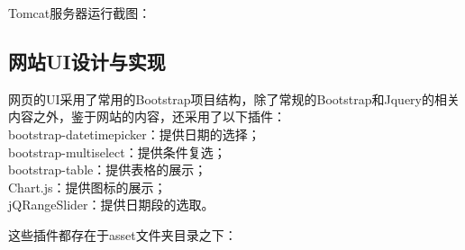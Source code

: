﻿\documentclass{article}
\begin{document}
\begin{CJK*}{GBK}{song}
Tomcat服务器运行截图：

\newpage

\begin{figure}[ht]
\centering
{}
\end{figure}

\subsection{网站UI设计与实现}

\qquad 网页的UI采用了常用的Bootstrap项目结构，除了常规的Bootstrap和Jquery的相关内容之外，鉴于网站的内容，还采用了以下插件：\\
bootstrap-datetimepicker：提供日期的选择；\\
bootstrap-multiselect：提供条件复选；\\
bootstrap-table：提供表格的展示；\\
Chart.js：提供图标的展示；\\
jQRangeSlider：提供日期段的选取。

这些插件都存在于asset文件夹目录之下：

\begin{figure}[ht]
\centering
{}
\end{figure}



\end{CJK*}
\end{document}
